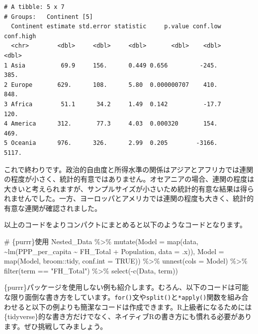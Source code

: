 \documentclass[
  a4paper,
  pandoc,
  ja=standard,
  jafont=haranoaji]{bxjsbook}
\newenvironment{Shaded}{\begin{snugshade}}{\end{snugshade}}
\newcommand{\AttributeTok}[1]{\textcolor[rgb]{0.00,0.48,0.65}{#1}}
\newcommand{\CommentTok}[1]{\textcolor[rgb]{0.37,0.37,0.37}{#1}}
\newcommand{\ConstantTok}[1]{\textcolor[rgb]{0.56,0.35,0.01}{#1}}
\newcommand{\FunctionTok}[1]{\textcolor[rgb]{0.28,0.35,0.67}{#1}}
\newcommand{\NormalTok}[1]{\textcolor[rgb]{0.00,0.48,0.65}{#1}}
\newcommand{\SpecialCharTok}[1]{\textcolor[rgb]{0.37,0.37,0.37}{#1}}
\newcommand{\StringTok}[1]{\textcolor[rgb]{0.13,0.47,0.30}{#1}}
\begin{document}
\begin{verbatim}
# A tibble: 5 x 7
# Groups:   Continent [5]
  Continent estimate std.error statistic     p.value conf.low conf.high
  <chr>        <dbl>     <dbl>     <dbl>       <dbl>    <dbl>     <dbl>
1 Asia          69.9     156.      0.449 0.656         -245.       385.
2 Europe       629.      108.      5.80  0.000000707    410.       848.
3 Africa        51.1      34.2     1.49  0.142          -17.7      120.
4 America      312.       77.3     4.03  0.000320       154.       469.
5 Oceania      976.      326.      2.99  0.205        -3166.      5117.
\end{verbatim}

これで終わりです。政治的自由度と所得水準の関係はアジアとアフリカでは連関の程度が小さく、統計的有意ではありません。オセアニアの場合、連関の程度は大きいと考えられますが、サンプルサイズが小さいため統計的有意な結果は得られませんでした。一方、ヨーロッパとアメリカでは連関の程度も大きく、統計的有意な連関が確認されました。

以上のコードをよりコンパクトにまとめると以下のようなコードとなります。

\begin{Shaded}
\begin{Highlighting}[numbers=left,,]
\CommentTok{\# \{purrr\}使用}
\NormalTok{Nested\_Data }\SpecialCharTok{\%\textgreater{}\%}
  \FunctionTok{mutate}\NormalTok{(}\AttributeTok{Model =} \FunctionTok{map}\NormalTok{(data, }\SpecialCharTok{\textasciitilde{}}\FunctionTok{lm}\NormalTok{(PPP\_per\_capita }\SpecialCharTok{\textasciitilde{}}\NormalTok{ FH\_Total }\SpecialCharTok{+}\NormalTok{ Population, }\AttributeTok{data =}\NormalTok{ .x)),}
         \AttributeTok{Model =} \FunctionTok{map}\NormalTok{(Model, broom}\SpecialCharTok{::}\NormalTok{tidy, }\AttributeTok{conf.int =} \ConstantTok{TRUE}\NormalTok{)) }\SpecialCharTok{\%\textgreater{}\%}
  \FunctionTok{unnest}\NormalTok{(}\AttributeTok{cols =}\NormalTok{ Model) }\SpecialCharTok{\%\textgreater{}\%}
  \FunctionTok{filter}\NormalTok{(term }\SpecialCharTok{==} \StringTok{"FH\_Total"}\NormalTok{) }\SpecialCharTok{\%\textgreater{}\%}
  \FunctionTok{select}\NormalTok{(}\SpecialCharTok{{-}}\FunctionTok{c}\NormalTok{(Data, term))}
\end{Highlighting}
\end{Shaded}

\{purrr\}パッケージを使用しない例も紹介します。むろん、以下のコードは可能な限り面倒な書き方をしています。\texttt{for()}文や\texttt{split()}と\texttt{*apply()}関数を組み合わせると以下の例よりも簡潔なコードは作成できます。R上級者になるためには\{tidyverse\}的な書き方だけでなく、ネイティブRの書き方にも慣れる必要があります。ぜひ挑戦してみましょう。
\end{document}
